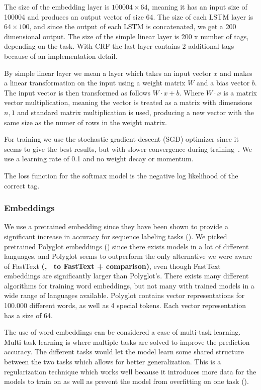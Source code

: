The size of the embedding layer is $100004 \times 64$, meaning it has an input
size of 100004 and produces an output vector of size 64. The size of each LSTM
layer is $64 \times 100$, and since the output of each LSTM is concatenated, we
get a 200 dimensional output. The size of the simple linear layer is 200 x
number of tags, depending on the task. With CRF the last layer contains 2
additional tags because of an implementation detail.

By simple linear layer we mean a layer which takes an input vector $x$ and makes
a linear transformation on the input using a weight matrix $W$ and a bias vector
$b$. The input vector is then transformed as follows $W \cdot x + b$. Where $W
\cdot x$ is a matrix vector multiplication, meaning the vector is treated as a
matrix with dimensions $n,1$ and standard matrix multiplication is used,
producing a new vector with the same size as the numer of rows in the weight
matrix.

For training we use the stochastic gradient descent (SGD) optimizer since it
seems to give the best results, but with slower convergence during
training~\cite{yang2018design}. We use a learning rate of 0.1 and no weight
decay or momentum.

The loss function for the softmax model is the negative log likelihood of the
correct tag. 

\subsubsection{Embeddings}

We use a pretrained embedding since they have been shown to provide a
significant increase in accuracy for sequence labeling tasks
(\cite{yang2018design}). We picked pretrained Polyglot
embeddings (\cite{polyglot:2013:ACL-CoNLL}) since there exists models in a lot of
different languages, and Polyglot seems to outperform the only alternative we
were aware of FastText \textbf{(\cite{joulin2016bagoftricks},~\cite{plank2018distant} to
FastText + comparison)}, even though FastText embeddings are significantly larger
than Polyglot's. There exists many different algorithms for training word
embeddings, but not many with trained models in a wide range of languages
available. Polyglot contains vector representations for 100.000 different words,
as well as 4 special tokens. Each vector representation has a size of 64.

The use of word embeddings can be considered a case of multi-task learning.
Multi-task learning is where multiple tasks are solved to improve the prediction
accuracy. The different tasks would let the model learn some shared structure
between the two tasks which allows for better generalization. This is a
regularization technique which works well because it introduces more data for
the models to train on as well as prevent the model from overfitting on one
task (\cite{goodfellow2016deep}).

